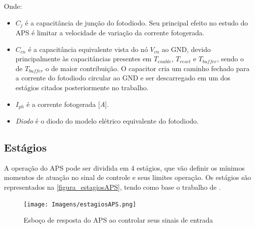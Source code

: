 Onde: 

\begin{itemize}
    \item $C_j$ \'e a capacit\^ancia de junção do fotodiodo. Seu principal efeito no estudo do APS \'e limitar a velocidade de variação da corrente fotogerada.
    
    \item $C_{cn}$ \'e a capacit\^ancia equivalente vista do n\'o $V_{cn}$ ao GND, devido principalmente às capacit\^ancias presentes em $T_{enable}$,  $T_{reset}$ e $T_{buffer}$, sendo o de $T_{buffer}$ o de maior contribuição. O capacitor cria um caminho fechado para a corrente do fotodiodo circular ao GND e ser descarregado em um dos est\'agios citados posteriormente no trabalho.
    
    \item $I_{ph}$ \'e a corrente fotogerada [\textit{A}].
    
    \item \textit{Diodo} \'e o diodo do modelo el\'etrico equivalente do fotodiodo.
\end{itemize}

\subsection{Est\'agios}
\label{estagiosAPS}

A operação do APS pode ser dividida em 4 est\'agios, que vão definir os m\'inimos momentos de  atuação no sinal de controle e seus limites operação. Os est\'agios são representados na \autoref{figura_estagiosAPS}, tendo como base o trabalho de \cite{LidianeCampos}.

\begin{figure}[!h]
	\caption{\label{figura_estagiosAPS}Esboço de resposta do APS ao controlar seus sinais de entrada}
	\begin{center}
	    \texttt{[image: Imagens/estagiosAPS.png]}
	\end{center}
\end{figure}


